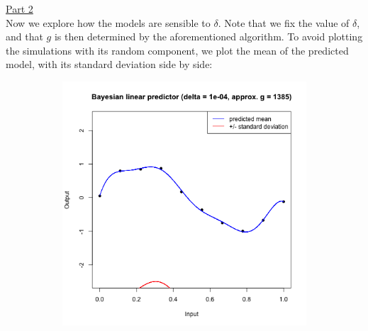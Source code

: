 \documentclass[a4paper, 11pt]{article}
\begin{document}
\newline \underline{Part 2}\\
\newline Now we explore how the models are sensible to $\delta$. Note that we fix the value of $\delta$, and that $g$ is then determined by the aforementioned algorithm. To avoid plotting the simulations with its random component, we plot the mean of the predicted model, with its standard deviation side by side:\\
\begin{figure}[H]
\centering
\begin{subfigure}{.5\textwidth}
  \centering
  \includegraphics[width=1\linewidth]{ps3F_plot3_1.png}
\end{subfigure}%
\begin{subfigure}{.5\textwidth}
  \centering

\end{subfigure}
\end{figure}
\end{document}
